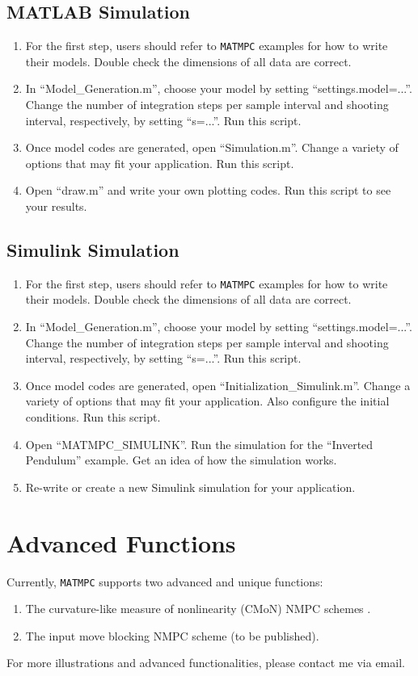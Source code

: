 \documentclass{article}
\newcommand{\software}[1]{{\tt#1}}
\begin{document}
\subsection{MATLAB Simulation}
\begin{enumerate}
	\item For the first step, users should refer to \software{MATMPC} examples for how to write their models. Double check the dimensions of all data are correct.
	\item In ``Model\_Generation.m'', choose your model by setting ``settings.model=...''. Change the number of integration steps per sample interval and shooting interval, respectively, by setting ``s=...''. Run this script.
	\item Once model codes are generated, open ``Simulation.m''. Change a variety of options that may fit your application. Run this script.
	\item Open ``draw.m'' and write your own plotting codes. Run this script to see your results.
\end{enumerate}

\subsection{Simulink Simulation}
\begin{enumerate}
	\item For the first step, users should refer to \software{MATMPC} examples for how to write their models. Double check the dimensions of all data are correct.
	\item In ``Model\_Generation.m'', choose your model by setting ``settings.model=...''. Change the number of integration steps per sample interval and shooting interval, respectively, by setting ``s=...''. Run this script.
	\item Once model codes are generated, open ``Initialization\_Simulink.m''. Change a variety of options that may fit your application. Also configure the initial conditions. Run this script.
	\item Open ``MATMPC\_SIMULINK''. Run the simulation for the ``Inverted Pendulum'' example. Get an idea of how the simulation works.
	\item Re-write or create a new Simulink simulation for your application.
\end{enumerate}

\section{Advanced Functions}
Currently, \software{MATMPC} supports two advanced and unique functions:
\begin{enumerate}
	\item The curvature-like measure of nonlinearity (CMoN) NMPC schemes \cite{chen2017fast, chen2018adaptive}.
	\item The input move blocking NMPC scheme (to be published). 
\end{enumerate}

For more illustrations and advanced functionalities, please contact me via email.



\end{document}
